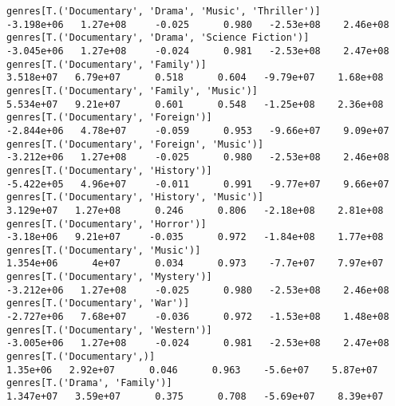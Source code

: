 \documentclass[11pt]{article}
\begin{document}
\begin{Verbatim}[commandchars=\\\{\}]
genres[T.('Documentary', 'Drama', 'Music', 'Thriller')]                                                      -3.198e+06   1.27e+08     -0.025      0.980   -2.53e+08    2.46e+08
genres[T.('Documentary', 'Drama', 'Science Fiction')]                                                        -3.045e+06   1.27e+08     -0.024      0.981   -2.53e+08    2.47e+08
genres[T.('Documentary', 'Family')]                                                                           3.518e+07   6.79e+07      0.518      0.604   -9.79e+07    1.68e+08
genres[T.('Documentary', 'Family', 'Music')]                                                                  5.534e+07   9.21e+07      0.601      0.548   -1.25e+08    2.36e+08
genres[T.('Documentary', 'Foreign')]                                                                         -2.844e+06   4.78e+07     -0.059      0.953   -9.66e+07    9.09e+07
genres[T.('Documentary', 'Foreign', 'Music')]                                                                -3.212e+06   1.27e+08     -0.025      0.980   -2.53e+08    2.46e+08
genres[T.('Documentary', 'History')]                                                                         -5.422e+05   4.96e+07     -0.011      0.991   -9.77e+07    9.66e+07
genres[T.('Documentary', 'History', 'Music')]                                                                 3.129e+07   1.27e+08      0.246      0.806   -2.18e+08    2.81e+08
genres[T.('Documentary', 'Horror')]                                                                           -3.18e+06   9.21e+07     -0.035      0.972   -1.84e+08    1.77e+08
genres[T.('Documentary', 'Music')]                                                                            1.354e+06      4e+07      0.034      0.973    -7.7e+07    7.97e+07
genres[T.('Documentary', 'Mystery')]                                                                         -3.212e+06   1.27e+08     -0.025      0.980   -2.53e+08    2.46e+08
genres[T.('Documentary', 'War')]                                                                             -2.727e+06   7.68e+07     -0.036      0.972   -1.53e+08    1.48e+08
genres[T.('Documentary', 'Western')]                                                                         -3.005e+06   1.27e+08     -0.024      0.981   -2.53e+08    2.47e+08
genres[T.('Documentary',)]                                                                                     1.35e+06   2.92e+07      0.046      0.963    -5.6e+07    5.87e+07
genres[T.('Drama', 'Family')]                                                                                 1.347e+07   3.59e+07      0.375      0.708   -5.69e+07    8.39e+07

\end{Verbatim}
\end{document}
